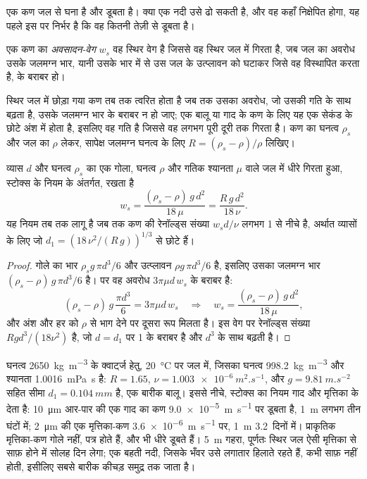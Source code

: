 एक कण जल से घना है और डूबता है। क्या एक नदी उसे ढो सकती है, और वह कहाँ निक्षेपित होगा, यह पहले इस पर निर्भर है कि वह कितनी तेज़ी से डूबता है।

\begin{definition}[अवसादन-वेग]\label{def:b1:erosion-transport:settling}
एक कण का \emph{अवसादन-वेग} $w_s$ वह स्थिर वेग है जिससे वह स्थिर जल में गिरता है, जब जल का अवरोध उसके जलमग्न भार, यानी उसके भार में से उस जल के उत्प्लावन को घटाकर जिसे वह विस्थापित करता है, के बराबर हो।
\end{definition}

स्थिर जल में छोड़ा गया कण तब तक त्वरित होता है जब तक उसका अवरोध, जो उसकी गति के साथ बढ़ता है, उसके जलमग्न भार के बराबर न हो जाए; एक बालू या गाद के कण के लिए यह एक सेकंड के छोटे अंश में होता है, इसलिए  वह गति है जिससे वह लगभग पूरी दूरी तक गिरता है। कण का घनत्व $\rho_s$ और जल का $\rho$ लेकर, सापेक्ष जलमग्न घनत्व के लिए $R = (\rho_s - \rho)/\rho$ लिखिए।

\begin{proposition}[स्टोक्स अवसादन]\label{prop:b1:erosion-transport:stokes}
व्यास $d$ और घनत्व $\rho_s$ का एक गोला, घनत्व $\rho$ और गतिक श्यानता $\mu$ वाले जल में धीरे गिरता हुआ, स्टोक्स के नियम के अंतर्गत,  रखता है
\[
  w_s = \frac{(\rho_s - \rho)\,g\,d^2}{18\,\mu} = \frac{R\,g\,d^2}{18\,\nu}.
\]
यह नियम तब तक लागू है जब तक कण की रेनॉल्ड्स संख्या $w_s d/\nu$ लगभग 1 से नीचे है, अर्थात व्यासों के लिए जो $d_1 = \left(18\,\nu^2/(R\,g)\right)^{1/3}$ से छोटे हैं।
\end{proposition}

\begin{proof}
गोले का भार $\rho_s g\,\pi d^3/6$ और उत्प्लावन $\rho g\,\pi d^3/6$ है, इसलिए उसका जलमग्न भार $(\rho_s - \rho)\,g\,\pi d^3/6$ है।  पर वह अवरोध $3\pi\mu d\,w_s$ के बराबर है:
\[
  (\rho_s - \rho)\,g\,\frac{\pi d^3}{6} = 3\pi\mu d\,w_s
  \quad\Longrightarrow\quad
  w_s = \frac{(\rho_s - \rho)\,g\,d^2}{18\,\mu},
\]
और अंश और हर को $\rho$ से भाग देने पर दूसरा रूप मिलता है। इस वेग पर रेनॉल्ड्स संख्या $R g d^3/(18\nu^2)$ है, जो $d = d_1$ पर 1 के बराबर है और $d^3$ के साथ बढ़ती है।
\end{proof}

घनत्व \qty{2650}{kg.m^{-3}} के क्वार्ट्ज हेतु, \qty{20}{\celsius} पर जल में, जिसका घनत्व \qty{998.2}{kg.m^{-3}} और श्यानता \qty{1.0016}{mPa.s} है: $R =
1.65$, $\nu = \qty{1.003e-6}{m^2.s^{-1}}$, और $g =
\qty{9.81}{m.s^{-2}}$ सहित सीमा $d_1 = \qty{0.104}{mm}$ है, एक बारीक बालू। इससे नीचे, स्टोक्स का नियम गाद और मृत्तिका के  देता है: \qty{10}{\micro m} आर-पार की एक गाद का कण \qty{9.0e-5}{m.s^{-1}} पर डूबता है, \qty{1}{m} लगभग तीन घंटों में; \qty{2}{\micro m} की एक मृत्तिका-कण \qty{3.6e-6}{m.s^{-1}} पर, \qty{1}{m} \num{3.2}~दिनों में। प्राकृतिक मृत्तिका-कण गोले नहीं, पत्र होते हैं, और भी धीरे डूबते हैं। \qty{5}{m} गहरा, पूर्णतः स्थिर जल ऐसी मृत्तिका से साफ़ होने में सोलह दिन लेगा; एक बहती नदी, जिसके भँवर उसे लगातार हिलाते रहते हैं, कभी साफ़ नहीं होती, इसीलिए सबसे बारीक कीचड़ समुद्र तक जाता है।

